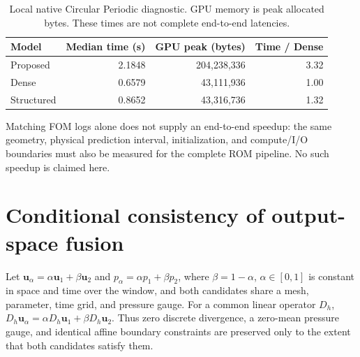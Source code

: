 \documentclass{article}
\begin{document}
\begin{table}[H]
\centering
\caption{Local native Circular Periodic diagnostic. GPU memory is peak
allocated bytes. These times are not complete end-to-end latencies.}
\label{tab:local_latency}
\small
\begin{tabular}{@{}lrrr@{}}
\toprule
Model & Median time (s) & GPU peak (bytes) & Time / Dense\\
\midrule
Proposed & 2.1848 & 204,238,336 & 3.32\\
Dense & 0.6579 & 43,111,936 & 1.00\\
Structured & 0.8652 & 43,316,736 & 1.32\\
\bottomrule
\end{tabular}
\end{table}

Matching FOM logs alone does not supply an end-to-end speedup: the same
geometry, physical prediction interval, initialization, and compute/I/O
boundaries must also be measured for the complete ROM pipeline. No such
speedup is claimed here.

\section{Conditional consistency of output-space fusion}
\label{app:fusion_consistency}
Let $\bm u_\alpha=\alpha\bm u_1+\beta\bm u_2$ and $p_\alpha=\alpha p_1+\beta p_2$, where $\beta=1-\alpha$, $\alpha\in[0,1]$ is constant in space and time over the window, and both candidates share a mesh, parameter, time grid, and pressure gauge. For a common linear operator $D_h$, $D_h\bm u_\alpha=\alpha D_h\bm u_1+\beta D_h\bm u_2$. Thus zero discrete divergence, a zero-mean pressure gauge, and identical affine boundary constraints are preserved only to the extent that both candidates satisfy them.
\end{document}
